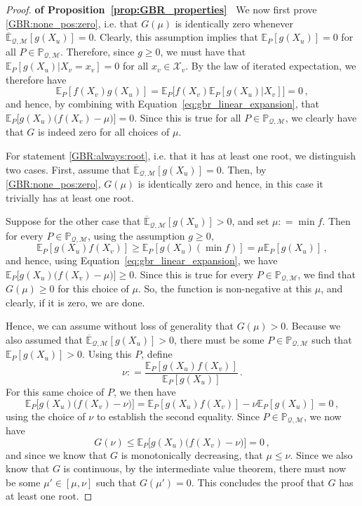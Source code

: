 \documentclass[twoside,11pt]{article}
\newcommand{\states}{\mathcal{X}}
\newcommand{\uexp}{\overline{\mathbb{E}}_{\rateset,\mathcal{M}}}
\newcommand{\rateset}{\mathcal{Q}}
\newcommand{\coloneqq}{:\!=}
\begin{document}
\begin{proof}{\bf of Proposition~\ref{prop:GBR_properties}~}
We now first prove \ref{GBR:none_pos:zero}, i.e. that $G(\mu)$ is identically zero whenever $\uexp[g(X_u)]=0$. Clearly, this assumption implies that $\mathbb{E}_P[g(X_u)]=0$ for all $P\in\mathbb{P}_{\rateset,\mathcal{M}}$. Therefore, since $g\geq 0$, we must have that $\mathbb{E}_P[g(X_u)\vert X_v=x_v]=0$ for all $x_v\in\states_v$. By the law of iterated expectation, we therefore have
\begin{equation*}
\mathbb{E}_P[f(X_v)g(X_u)] = \mathbb{E}_P\bigl[f(X_v)\mathbb{E}_P[g(X_u)\vert X_v]\bigr] = 0\,,
\end{equation*}
and hence, by combining with Equation~\ref{eq:gbr_linear_expansion}, that $\mathbb{E}_P\bigl[g(X_u)\bigl(f(X_v) - \mu\bigr)\bigr]=0$. Since this is true for all $P\in\mathbb{P}_{\rateset,\mathcal{M}}$, we clearly have that $G$ is indeed zero for all choices of $\mu$.

For statement \ref{GBR:always:root}, i.e. that it has at least one root, we distinguish two cases. First, assume that $\uexp[g(X_u)]=0$. Then, by \ref{GBR:none_pos:zero}, $G(\mu)$ is identically zero and hence, in this case it trivially has at least one root.

Suppose for the other case that $\uexp[g(X_u)]>0$, and set $\mu\coloneqq \min f$. Then for every $P\in\mathbb{P}_{\rateset,\mathcal{M}}$, using the assumption $g\geq 0$,
\begin{equation*}
\mathbb{E}_P[g(X_u)f(X_v)] \geq \mathbb{E}_P[g(X_u)(\min f)] = \mu\mathbb{E}_P[g(X_u)]\,,
\end{equation*}
and hence, using Equation~\eqref{eq:gbr_linear_expansion}, we have $\mathbb{E}_P\bigl[g(X_u)\bigl(f(X_v) - \mu\bigr)\bigr] \geq 0$. Since this is true for every $P\in\mathbb{P}_{\rateset,\mathcal{M}}$, we find that $G(\mu)\geq 0$ for this choice of $\mu$. So, the function is non-negative at this $\mu$, and clearly, if it is zero, we are done.

Hence, we can assume without loss of generality that $G(\mu) > 0$. Because we also assumed that $\uexp[g(X_u)] > 0$, there must be some $P\in\mathbb{P}_{\rateset,\mathcal{M}}$ such that $\mathbb{E}_P[g(X_u)]>0$. Using this $P$, define
\begin{equation*}
\nu \coloneqq \frac{\mathbb{E}_P[g(X_u)f(X_v)]}{\mathbb{E}_P[g(X_u)]}\,.
\end{equation*}
For this same choice of $P$, we then have
\begin{equation*}
\mathbb{E}_P\bigl[g(X_u)\bigl(f(X_v) - \nu\bigr)\bigr] = \mathbb{E}_P[g(X_u)f(X_v)] - \nu\mathbb{E}_P[g(X_u)] = 0\,,
\end{equation*}
using the choice of $\nu$ to establish the second equality. Since $P\in\mathbb{P}_{\rateset,\mathcal{M}}$, we now have
\begin{equation*}
G(\nu) \leq \mathbb{E}_P\bigl[g(X_u)\bigl(f(X_v) - \nu\bigr)\bigr] = 0\,,
\end{equation*}
and since we know that $G$ is monotonically decreasing, that $\mu\leq \nu$. Since we also know that $G$ is continuous, by the intermediate value theorem, there must now be some $\mu'\in [\mu,\nu]$ such that $G(\mu') = 0$. This concludes the proof that $G$ has at least one root.


\end{proof}
\end{document}
